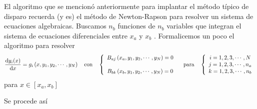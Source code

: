 \documentclass[spanish,titlepage,11pt]{article}
\begin{document}
El algoritmo que se mencion\'{o} anteriormente para implantar el m\'{e}todo
t\'{i}pico de disparo recuerda (y es) el m\'{e}todo de Newton-Rapson para
resolver un sistema de ecuaciones algebraicas. Buscamos $n_{b}$ funciones de
$n_{b}$ variables que integran el sistema de ecuaciones diferenciales entre
$x_{a}$ y $x_{b}$ . Formalicemos un poco el algoritmo para resolver
\[
\frac{\mathrm{d}y_{i}(x)}{\mathrm{d}x}=g_{i}\left(  x,y_{1},y_{2},\cdots
,y_{N}\right)  \quad\mathrm{con\quad}\left\{
\begin{array}
[c]{c}%
B_{aj}\left(  x_{a},y_{1},y_{2},\cdots,y_{N}\right)  =0\\
\\
B_{bk}\left(  x_{b},y_{1},y_{2},\cdots,y_{N}\right)  =0
\end{array}
\right.  \quad\mathrm{para\quad}\left\{
\begin{array}
[c]{c}%
i=1,2,3,\cdots,N\\
j=1,2,3,\cdots,n_{a}\\
k=1,2,3,\cdots,n_{b}%
\end{array}
\right.
\]
para $x\in\left[  x_{a},x_{b}\right]  $

Se procede as\'{i}
\end{document}

